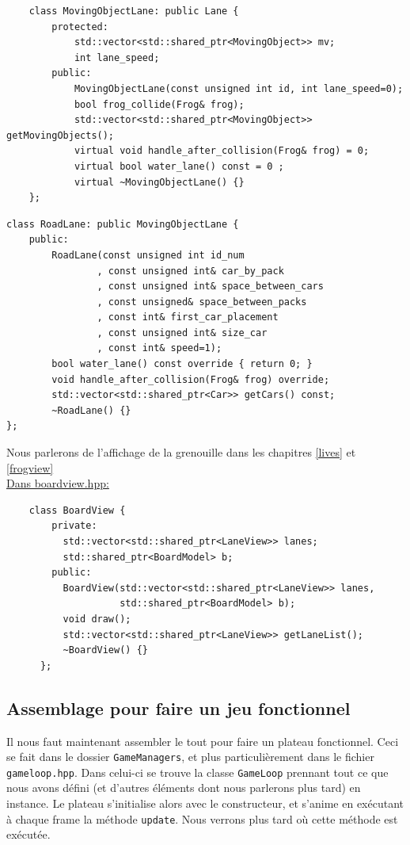 \documentclass[a4paper, 12pt]{article}
\begin{document}
\begin{lstlisting}
    class MovingObjectLane: public Lane {
        protected:
            std::vector<std::shared_ptr<MovingObject>> mv;
            int lane_speed;
        public:
            MovingObjectLane(const unsigned int id, int lane_speed=0);
            bool frog_collide(Frog& frog);
            std::vector<std::shared_ptr<MovingObject>> getMovingObjects();
            virtual void handle_after_collision(Frog& frog) = 0;
            virtual bool water_lane() const = 0 ;
            virtual ~MovingObjectLane() {}
    };   
\end{lstlisting}

\begin{lstlisting}
class RoadLane: public MovingObjectLane {
    public:
        RoadLane(const unsigned int id_num
                , const unsigned int& car_by_pack
                , const unsigned int& space_between_cars
                , const unsigned& space_between_packs
                , const int& first_car_placement
                , const unsigned int& size_car
                , const int& speed=1);
        bool water_lane() const override { return 0; }
        void handle_after_collision(Frog& frog) override;
        std::vector<std::shared_ptr<Car>> getCars() const;
        ~RoadLane() {}
};
\end{lstlisting}

Nous parlerons de l'affichage de la grenouille dans les chapitres \ref{lives} et \ref{frogview} \\

\underline{Dans boardview.hpp:} \hspace{0.5cm}

\begin{lstlisting}
    class BoardView {
        private:
          std::vector<std::shared_ptr<LaneView>> lanes;
          std::shared_ptr<BoardModel> b;
        public:
          BoardView(std::vector<std::shared_ptr<LaneView>> lanes,
                    std::shared_ptr<BoardModel> b);
          void draw();
          std::vector<std::shared_ptr<LaneView>> getLaneList();
          ~BoardView() {}
      };
\end{lstlisting}


\subsection{Assemblage pour faire un jeu fonctionnel}

Il nous faut maintenant assembler le tout pour faire un plateau fonctionnel. Ceci se fait dans le dossier \texttt{GameManagers}, et plus particulièrement dans le fichier \texttt{gameloop.hpp}. Dans celui-ci se trouve la classe \texttt{GameLoop} prennant tout ce que nous avons défini (et d'autres éléments dont nous parlerons plus tard) en instance. Le plateau s'initialise alors avec le constructeur, et s'anime en exécutant à chaque frame la méthode \texttt{update}. Nous verrons plus tard où cette méthode est exécutée.
\end{document}
